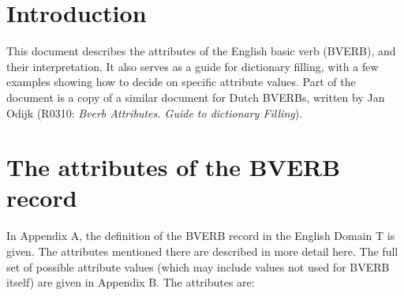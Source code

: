 

   \RosSupersedes{-}
   \MakeRosTitle
%
%

\section{Introduction}

This document describes the attributes of the English basic verb (BVERB), and their 
interpretation. It also serves as a guide for dictionary filling, with a few 
examples showing how to decide on specific attribute values.
Part of the document is a copy of a similar 
document for Dutch BVERBs, written by Jan Odijk (R0310: {\em Bverb Attributes. 
Guide to dictionary Filling\/}).

 
\section{The attributes of the BVERB record}
In Appendix A, the definition of the BVERB record in the English Domain T is 
given. The attributes mentioned there are described in more detail here. The 
full set of possible attribute values (which may include values not used for 
 BVERB itself) are given in Appendix B. The attributes are:

